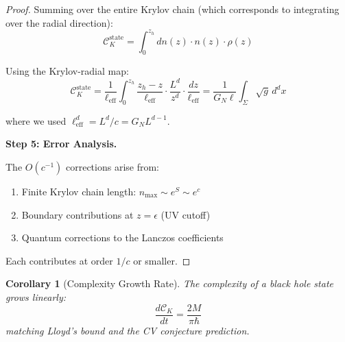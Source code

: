 \documentclass[12pt,a4paper]{article}
\newtheorem{corollary}[theorem]{Corollary}
\begin{document}
\begin{proof}
Summing over the entire Krylov chain (which corresponds to integrating over the radial direction):
\begin{equation}
\mathcal{C}_K^{\text{state}} = \int_0^{z_h} dn(z) \cdot n(z) \cdot \rho(z)
\end{equation}

Using the Krylov-radial map:
\begin{equation}
\mathcal{C}_K^{\text{state}} = \frac{1}{\ell_{\text{eff}}} \int_0^{z_h} \frac{z_h - z}{\ell_{\text{eff}}} \cdot \frac{L^d}{z^d} \cdot \frac{dz}{\ell_{\text{eff}}} = \frac{1}{G_N \ell} \int_\Sigma \sqrt{g} \, d^d x
\end{equation}

where we used $\ell_{\text{eff}}^d = L^d/c = G_N L^{d-1}$.

\textbf{Step 5: Error Analysis.}

The $O(c^{-1})$ corrections arise from:
\begin{enumerate}
    \item Finite Krylov chain length: $n_{\max} \sim e^S \sim e^c$
    \item Boundary contributions at $z = \epsilon$ (UV cutoff)
    \item Quantum corrections to the Lanczos coefficients
\end{enumerate}

Each contributes at order $1/c$ or smaller.
\end{proof}

\begin{corollary}[Complexity Growth Rate]
The complexity of a black hole state grows linearly:
\begin{equation}
\frac{d\mathcal{C}_K}{dt} = \frac{2M}{\pi\hbar}
\end{equation}
matching Lloyd's bound and the CV conjecture prediction.
\end{corollary}
\end{document}
